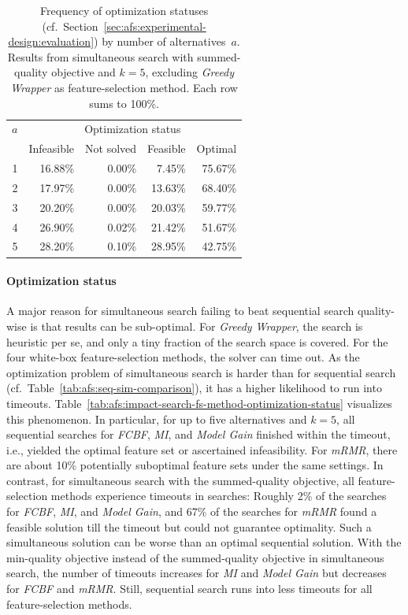 \documentclass{article}
\theoremstyle{definition}
\begin{document}
\begin{table}[htb]
	\centering
	\begin{tabular}{rrrrr}
		\toprule
		$a$ & \multicolumn{4}{c}{Optimization status} \\
		\cmidrule(r){2-5}
		& Infeasible & Not solved & Feasible & Optimal \\
		\midrule
		1 & 16.88\% & 0.00\% & 7.45\% & 75.67\% \\
		2 & 17.97\% & 0.00\% & 13.63\% & 68.40\% \\
		3 & 20.20\% & 0.00\% & 20.03\% & 59.77\% \\
		4 & 26.90\% & 0.02\% & 21.42\% & 51.67\% \\
		5 & 28.20\% & 0.10\% & 28.95\% & 42.75\% \\
		\bottomrule
	\end{tabular}
	\caption{
		Frequency of optimization statuses (cf.~Section~\ref{sec:afs:experimental-design:evaluation}) by number of alternatives~$a$.
		Results from simultaneous search with summed-quality objective and $k=5$, excluding \emph{Greedy Wrapper} as feature-selection method.
		Each row sums to 100\%.
	}
	\label{tab:afs:impact-num-alternatives-optimization-status}
\end{table}

\paragraph{Optimization status}

A major reason for simultaneous search failing to beat sequential search quality-wise is that results can be sub-optimal.
For \emph{Greedy Wrapper}, the search is heuristic per se, and only a tiny fraction of the search space is covered.
For the four white-box feature-selection methods, the solver can time out.
As the optimization problem of simultaneous search is harder than for sequential search (cf.~Table~\ref{tab:afs:seq-sim-comparison}), it has a higher likelihood to run into timeouts.
Table~\ref{tab:afs:impact-search-fs-method-optimization-status} visualizes this phenomenon.
In particular, for up to five alternatives and $k=5$, all sequential searches for \emph{FCBF}, \emph{MI}, and \emph{Model Gain} finished within the timeout, i.e., yielded the optimal feature set or ascertained infeasibility.
For \emph{mRMR}, there are about 10\% potentially suboptimal feature sets under the same settings.
In contrast, for simultaneous search with the summed-quality objective, all feature-selection methods experience timeouts in searches:
Roughly 2\% of the searches for \emph{FCBF}, \emph{MI}, and \emph{Model Gain}, and 67\% of the searches for \emph{mRMR} found a feasible solution till the timeout but could not guarantee optimality.
Such a simultaneous solution can be worse than an optimal sequential solution.
With the min-quality objective instead of the summed-quality objective in simultaneous search, the number of timeouts increases for \emph{MI} and \emph{Model Gain} but decreases for \emph{FCBF} and \emph{mRMR}.
Still, sequential search runs into less timeouts for all feature-selection methods.
\end{document}
